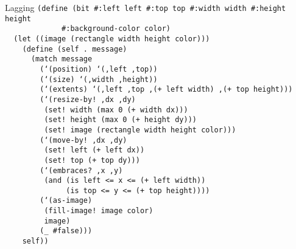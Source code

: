 \begin{frame}{Lagging}
  \tiny
  \texttt{(define (bit \#:left left \#:top top \#:width width \#:height height\\
    \ \ \ \ \ \ \ \ \ \ \ \ \ \#:background-color color)\\
    \ \ (let ((image (rectangle width height color)))\\
    \ \ \ \ (define (self .\ message)\\
    \ \ \ \ \ \ (match message\\
    \ \ \ \ \ \ \ \ (`(position) `(,left ,top))\\
    \ \ \ \ \ \ \ \ (`(size) `(,width ,height))\\
    \ \ \ \ \ \ \ \ (`(extents) `(,left ,top ,(+ left width) ,(+ top height)))\\
    \ \ \ \ \ \ \ \ (`(resize-by!\ ,dx ,dy)\\
    \ \ \ \ \ \ \ \ \ (set!\ width (max 0 (+ width dx)))\\
    \ \ \ \ \ \ \ \ \ (set!\ height (max 0 (+ height dy)))\\
    \ \ \ \ \ \ \ \ \ (set!\ image (rectangle width height color)))\\
    \ \ \ \ \ \ \ \ (`(move-by!\ ,dx ,dy)\\
    \ \ \ \ \ \ \ \ \ (set!\ left (+ left dx))\\
    \ \ \ \ \ \ \ \ \ (set!\ top (+ top dy)))\\
    \ \ \ \ \ \ \ \ (`(embraces?\ ,x ,y)\\
    \ \ \ \ \ \ \ \ \ (and (is left <= x <= (+ left width))\\
    \ \ \ \ \ \ \ \ \ \ \ \ \ \ (is top <= y <= (+ top height))))\\
    \ \ \ \ \ \ \ \ (`(as-image)\\
    \ \ \ \ \ \ \ \ \ (fill-image!\ image color)\\
    \ \ \ \ \ \ \ \ \ image)\\
    \ \ \ \ \ \ \ \ (\_ \#false)))\\
    \ \ \ \ self))
  }
\end{frame}

